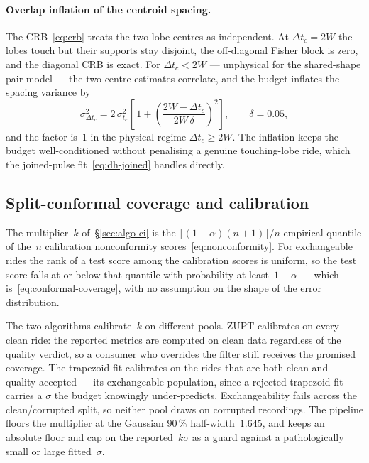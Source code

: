 \documentclass[manuscript,review,screen]{acmart}
\begin{document}
\paragraph{Overlap inflation of the centroid spacing.}
The CRB~\eqref{eq:crb} treats the two lobe centres as independent.
At $\Delta t_c=2W$ the lobes touch but their supports stay disjoint,
the off-diagonal Fisher block is zero, and the diagonal CRB is exact.
For $\Delta t_c<2W$ --- unphysical for the shared-shape pair model ---
the two centre estimates correlate, and the budget inflates the
spacing variance by
\begin{equation}
  \sigma_{\Delta t_c}^{2}
   =2\,\sigma_{t_c}^{2}\left[\,1+
     \left(\frac{2W-\Delta t_c}{2W\,\delta}\right)^{2}\right],
   \qquad \delta=0.05,
  \label{eq:overlap-inflation}
\end{equation}
and the factor is~$1$ in the physical regime $\Delta t_c\ge2W$.  The
inflation keeps the budget well-conditioned without penalising a
genuine touching-lobe ride, which the joined-pulse
fit~\eqref{eq:dh-joined} handles directly.

\subsection{Split-conformal coverage and calibration}
\label{app:pred-conformal}

The multiplier~$k$ of~\S\ref{sec:algo-ci} is the
$\lceil(1-\alpha)(n+1)\rceil/n$ empirical quantile of the~$n$
calibration nonconformity scores~\eqref{eq:nonconformity}.  For
exchangeable rides the rank of a test score among the calibration
scores is uniform, so the test score falls at or below that quantile
with probability at least~$1-\alpha$ --- which
is~\eqref{eq:conformal-coverage}, with no assumption on the shape of
the error distribution.

The two algorithms calibrate~$k$ on different pools.  ZUPT calibrates
on every clean ride: the reported metrics are computed on clean data
regardless of the quality verdict, so a consumer who overrides the
filter still receives the promised coverage.  The trapezoid fit
calibrates on the rides that are both clean and quality-accepted ---
its exchangeable population, since a rejected trapezoid fit carries a
$\sigma$ the budget knowingly under-predicts.  Exchangeability fails
across the clean/corrupted split, so neither pool draws on corrupted
recordings.  The pipeline floors the multiplier at the Gaussian
$90\,\%$ half-width~$1.645$, and keeps an absolute floor and cap on
the reported~$k\sigma$ as a guard against a pathologically small or
large fitted~$\sigma$.
\end{document}
